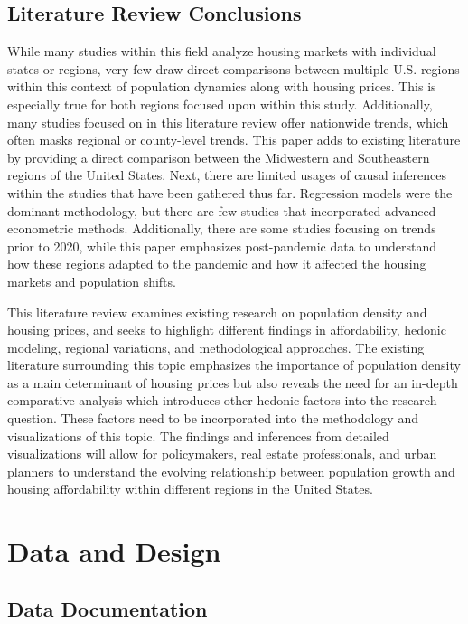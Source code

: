 \documentclass[journal,article,submit,pdftex,moreauthors]{Definitions/mdpi}
\begin{document}
\subsection{Literature Review Conclusions}

While many studies within this field analyze housing markets with individual states or regions, very few draw direct comparisons between multiple U.S. regions within this context of population dynamics along with housing prices. This is especially true for both regions focused upon within this study. Additionally, many studies focused on in this literature review offer nationwide trends, which often masks regional or county-level trends. This paper adds to existing literature by providing a direct comparison between the Midwestern and Southeastern regions of the United States. Next, there are limited usages of causal inferences within the studies that have been gathered thus far. Regression models were the dominant methodology, but there are few studies that incorporated advanced econometric methods. Additionally, there are some studies focusing on trends prior to 2020, while this paper emphasizes post-pandemic data to understand how these regions adapted to the pandemic and how it affected the housing markets and population shifts.

This literature review examines existing research on population density and housing prices, and seeks to highlight different findings in affordability, hedonic modeling, regional variations, and methodological approaches. The existing literature surrounding this topic emphasizes the importance of population density as a main determinant of housing prices but also reveals the need for an in-depth comparative analysis which introduces other hedonic factors into the research question. These factors need to be incorporated into the methodology and visualizations of this topic. The findings and inferences from detailed visualizations will allow for policymakers, real estate professionals, and urban planners to understand the evolving relationship between population growth and housing affordability within different regions in the United States.


\section{Data and Design}

\subsection{Data Documentation}
\end{document}
